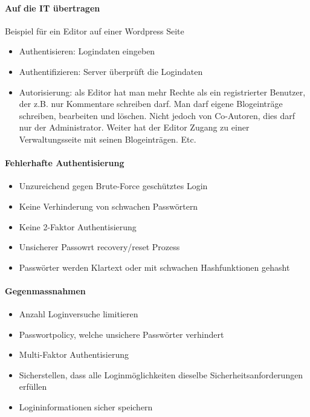 \documentclass[10pt,a4paper]{article}
\begin{document}
\paragraph*{Auf die IT übertragen}Beispiel für ein Editor auf einer Wordpress Seite
\begin{itemize}[noitemsep,topsep=0pt,leftmargin=*]
    \item Authentisieren: Logindaten eingeben
    \item Authentifizieren: Server überprüft die Logindaten
    \item Autorisierung: als Editor hat man mehr Rechte als ein registrierter Benutzer, der z.B. nur Kommentare schreiben darf. Man darf eigene Blogeinträge schreiben, bearbeiten und löschen. Nicht jedoch von Co-Autoren, dies darf nur der Administrator. Weiter hat der Editor Zugang zu einer Verwaltungsseite mit seinen Blogeinträgen. Etc.
\end{itemize}

\paragraph*{Fehlerhafte Authentisierung}
\begin{itemize}[noitemsep,topsep=0pt,leftmargin=*]
    \item Unzureichend gegen Brute-Force geschütztes Login
    \item Keine Verhinderung von schwachen Passwörtern
    \item Keine 2-Faktor Authentisierung
    \item Unsicherer Passowrt recovery/reset Prozess
    \item Passwörter werden Klartext oder mit schwachen Hashfunktionen gehasht
\end{itemize}

\paragraph*{Gegenmassnahmen}
\begin{itemize}[noitemsep,topsep=0pt,leftmargin=*]
    \item Anzahl Loginversuche limitieren
    \item Passwortpolicy, welche unsichere Passwörter verhindert
    \item Multi-Faktor Authentisierung
    \item Sicherstellen, dass alle Loginmöglichkeiten dieselbe Sicherheitsanforderungen erfüllen
    \item Logininformationen sicher speichern
\end{itemize}
\end{document}
